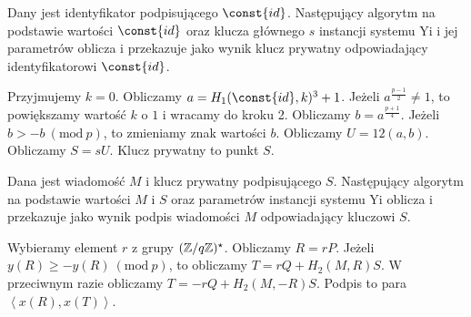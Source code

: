\begin{algorithm}
Dany jest identyfikator podpisującego $\const{id}$.
Następujący algorytm na podstawie wartości $\const{id}$
oraz klucza głównego $s$ instancji systemu Yi i jej parametrów
oblicza i przekazuje jako wynik
klucz prywatny odpowiadający identyfikatorowi $\const{id}$.

\begin{codebox}
\li
Przyjmujemy $k = 0$.
\li
Obliczamy $a = H_1(\const{id}, k)^3 + 1$.
\li
Jeżeli $a^{\frac{p-1}{2}} \neq 1$, to powiększamy wartość $k$ o $1$ i wracamy do kroku 2.
\li
Obliczamy $b = a^{\frac{p+1}{4}}$.
\li
Jeżeli $b > -b\ (\text{mod}\ p)$, to zmieniamy znak wartości $b$.
\li
Obliczamy $U = 12(a, b)$.
\li
Obliczamy $S = sU$.
\li
Klucz prywatny to punkt $S$.
\end{codebox}
\end{algorithm}

\begin{algorithm}
Dana jest wiadomość $M$
i klucz prywatny podpisującego $S$.
Następujący algorytm na podstawie wartości $M$ i $S$
oraz parametrów instancji systemu Yi
oblicza i przekazuje jako wynik
podpis wiadomości $M$ odpowiadający kluczowi $S$.

\begin{codebox}
\li
Wybieramy element $r$ z grupy $(\mathbb{Z}/q\mathbb{Z})^\star$.
\li
Obliczamy $R = rP$.
\li
Jeżeli $y(R) \geq -y(R)\ (\text{mod}\ p)$,
to obliczamy $T = rQ + H_2(M, R)S$.
\li
W przeciwnym razie obliczamy $T = -rQ + H_2(M, -R)S$.
\li
Podpis to para $\left\langle x(R), x(T) \right\rangle$.
\end{codebox}
\end{algorithm}

